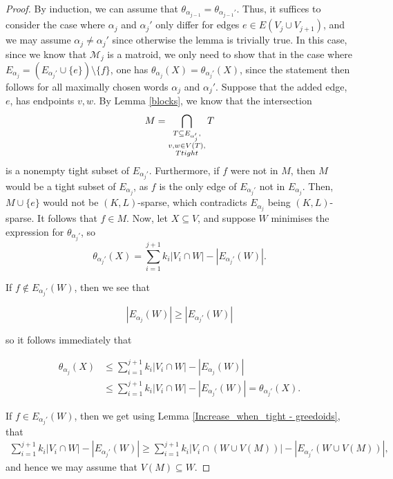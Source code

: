 \documentclass{article}
\begin{document}
\begin{proof}
By induction, we can assume that $\theta_{\alpha_{j-1}} = \theta_{\alpha_{j-1}'}$. Thus, it suffices to consider the case where $\alpha_{j}$ and $\alpha_{j}'$ only differ for edges $e\in E(V_{j}\cup V_{j+1})$, and we may assume $\alpha_{j}\neq \alpha_{j}'$ since otherwise the lemma is trivially true. In this case, since we know that $\mathcal{M}_{j}$ is a matroid, we only need to show that in the case where $E_{\alpha_{j}} = \left (E_{\alpha_{j}'} \cup \{e\}\right) \setminus \{f\}$, one has $\theta_{\alpha_{j}}(X) = \theta_{\alpha_{j}'}(X)$, since the statement then follows for all maximally chosen words $\alpha_j$ and $\alpha_j'$. Suppose that the added edge, $e$, has endpoints $v,w$. By Lemma \ref{blocks}, we know that the intersection 
\begin{equation*}
M  = \bigcap_{\substack{T\subseteq E_{\alpha_j'},\\ v,w \in V(T),\\ T \textup{ tight }}} T
\end{equation*}
is a nonempty tight subset of $E_{\alpha_j'}$.  Furthermore, if $f$ were not in $M$, then $M$ would be a tight subset of $E_{\alpha_j}$, as $f$ is the only edge of $E_{\alpha_j'}$ not in $E_{\alpha_j}$. Then, $M \cup \{e\}$ would not be $(K,L)$-sparse, which contradicts $E_{\alpha_j}$ being $(K,L)$-sparse. It follows that $f \in M$.  Now, let $X\subseteq V$, and suppose $W$ minimises the expression for $\theta_{\alpha_j'}$, so
\begin{equation*}
\theta_{\alpha_{j}'}(X) = \sum_{i=1}^{j+1} k_i|V_i\cap W| -|E_{\alpha_j'}(W)|.
\end{equation*}

 If $f \notin E_{\alpha_j'}(W)$, then we see that

 \[|E_{\alpha_j}(W)| \geq |E_{\alpha_j'}(W)|\]

so it follows immediately that 

\begin{align*}
    \theta_{\alpha_j}(X) &\leq  \sum_{i=1}^{j+1} k_i |V_i \cap W| - |E_{\alpha_{j}}(W)| \\
    &\leq \sum_{i=1}^{j+1} k_i |V_i \cap W| - |E_{\alpha_{j}'}(W)| = \theta_{\alpha_j'}(X).
\end{align*}
 
 If $f \in E_{\alpha_j'}(W)$, then we get using Lemma \ref{Increase_when_tight - greedoids}, that
\begin{align*}
\sum_{i=1}^{j+1} k_i |V_i\cap W| - |E_{\alpha_j'}(W)|  \geq \sum_{i=1}^{j+1} k_i |V_i\cap (W\cup V(M))| - |E_{\alpha_{j}'}(W \cup V(M))|,
\end{align*}
and hence we may assume that $V(M) \subseteq W$.


\end{proof}
\end{document}
